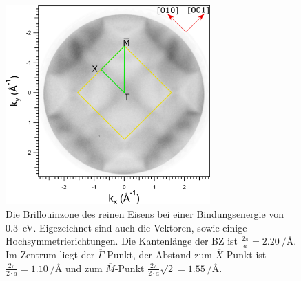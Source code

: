             \begin{figure}
                \centering
                \includegraphics[width=0.7\textwidth]{./content/pictures/Fe/BZ_Fe.png}
                \caption{Die Brillouinzone des reinen Eisens bei einer Bindungsenergie von \SI{0.3}{\electronvolt}.
                Eigezeichnet sind auch die Vektoren, sowie einige Hochsymmetrierichtungen.
                Die Kantenlänge der BZ ist $\frac{2\pi}{a} = \SI[per-mode=reciprocal]{2.20}{\per\angstrom}$.
                Im Zentrum liegt der $\overline{\Gamma}$-Punkt, der Abstand zum $\overline{X}$-Punkt ist $\frac{2\pi}{2 \cdot a} = \SI[per-mode=reciprocal]{1.10}{\per\angstrom}$ und zum $\overline{M}$-Punkt $\frac{2\pi}{2 \cdot a} \sqrt{2} = \SI[per-mode=reciprocal]{1.55}{\per\angstrom}$.}
                \label{fig:BZ_Fe}
            \end{figure}
